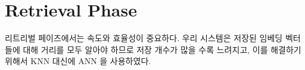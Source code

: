 \section{Retrieval Phase}
리트리벌 페이즈에서는 속도와 효율성이 중요하다. 우리 시스템은 저장된 임베딩 벡터들에 대해 거리를 모두 알아야 하므로 저장 개수가 많을 수록 느려지고, 이를 해결하기 위해서 KNN 대신에 ANN 을 사용하였다.  %
